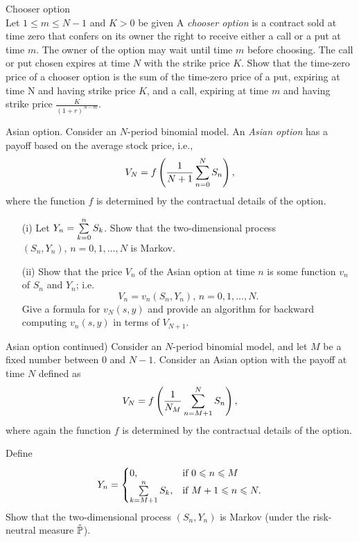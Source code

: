 \begin{solution}
\begin{solution}
\begin{problem}
 Chooser option \\
 Let $1\le m\le N-1$ and $K>0$ be given
A \emph{chooser option} is a contract sold at time zero that confers on its owner
the right to receive either a call or a put at time $m$. The owner of the option may
wait until time $m$ before choosing. The call or put chosen expires at time $N$ with
the strike price $K$. Show that the time-zero price of a chooser option is the sum of
the time-zero price of a put, expiring at time N and having strike price $K$, and a call,
expiring at time $m$ and having strike price $\frac{K}{(1+r)^{N-m}}.$
\end{problem} 
\begin{solution} 

\end{solution}

\begin{problem}
Asian option. Consider an $N$-period binomial model.
An \emph{Asian option} has a payoff based on the average stock price, i.e.,
\[
V_N=f\left(\frac{1}{N+1}\sum\lims_{n=0}^{N} S_n \right),
\]
\ni where the function $f$ is determined by the contractual details of the option.
\begin{itemize}
\item[(i)] Let $Y_n=\sum\lims_{k=0}^{n} S_k$. Show that the two-dimensional process
$(S_n,Y_n),\, n=0,1,\dots,N$ is Markov.

\item[(ii)] Show that the price $V_n$ of the Asian option at time $n$
is some function $v_n$ of $S_n$ and $Y_n$; i.e.
\[
V_n=v_n(S_n,Y_n),\, n=0,1,\dots,N.
\]
\ni Give a formula for $v_N(s,y)$ and provide an algorithm for backward computing
$v_n(s,y)$ in terms of $V_{N+1}.$
\end{itemize}

\end{problem} 
\begin{solution} 

\end{solution}

\begin{problem}
 Asian option continued) Consider an $N$-period binomial model,
and let $M$ be a fixed number between $0$ and $N-1$. Consider an Asian option with the payoff
at time $N$ defined as
\[
V_N=f\left(\frac{1}{N_M}\sum\lims_{n=M+1}^{N} S_n \right),
\]
\ni where again the function $f$ is determined by the contractual details of the option.

Define
\[
Y_n=
\begin{cases}
0,&\text{if }0\le n\le M\\
\sum\lims_{k=M+1}^{n} S_k,&\text{if }M+1\le n\le N.
\end{cases}
\]
\ni Show that the two-dimensional process $(S_n,Y_n)$ is Markov
(under the risk-neutral measure $\tilde{\P}$).


\end{problem}
\end{solution}
\end{solution}
